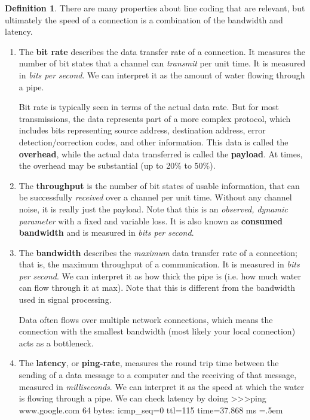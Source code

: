 \documentclass{article}
\theoremstyle{definition}
\newtheorem{definition}{Definition}[section]
\newenvironment{cverbatim}
    {\SaveVerbatim{cverb}}
    {\endSaveVerbatim
    \flushleft\fboxrule=0pt\fboxsep=.5em
    \colorbox{cverbbg}{%
      \makebox[\dimexpr\linewidth-2\fboxsep][l]{\BUseVerbatim{cverb}}%
    }
    \endflushleft
  }
\begin{document}
    \begin{definition}
      There are many properties about line coding that are relevant, but ultimately the speed of a connection is a combination of the bandwidth and latency. 

      \begin{enumerate}
        \item The \textbf{bit rate} describes the data transfer rate of a connection. It measures the number of bit states that a channel can \textit{transmit} per unit time. It is measured in \textit{bits per second}. We can interpret it as the amount of water flowing through a pipe. 
        
        Bit rate is typically seen in terms of the actual data rate. But for most transmissions, the data represents part of a more complex protocol, which includes bits representing source address, destination address, error detection/correction codes, and other information. This data is called the \textbf{overhead}, while the actual data transferred is called the \textbf{payload}. At times, the overhead may be substantial (up to 20\% to 50\%). 

        \item The \textbf{throughput} is the number of bit states of usable information, that can be successfully \textit{received} over a channel per unit time. Without any channel noise, it is really just the payload. Note that this is an \textit{observed, dynamic parameter} with a fixed and variable loss. It is also known as \textbf{consumed bandwidth} and is measured in \textit{bits per second}. 
        
        \item The \textbf{bandwidth} describes the \textit{maximum} data transfer rate of a connection; that is, the maximum throughput of a communication. It is measured in \textit{bits per second}. We can interpret it as how thick the pipe is (i.e. how much water can flow through it at max). Note that this is different from the bandwidth used in signal processing. 
        
        Data often flows over multiple network connections, which means the connection with the smallest bandwidth (most likely your local connection) acts as a bottleneck. 
        
        \item The \textbf{latency}, or \textbf{ping-rate}, measures the round trip time between the sending of a data message to a computer and the receiving of that message, measured in \textit{milliseconds}. We can interpret it as the speed at which the water is flowing through a pipe. We can check latency by doing
        \begin{cverbatim}
          >>>ping www.google.com
          64 bytes: icmp_seq=0 ttl=115 time=37.868 ms
        \end{cverbatim}


\end{enumerate}
\end{definition}
\end{document}
